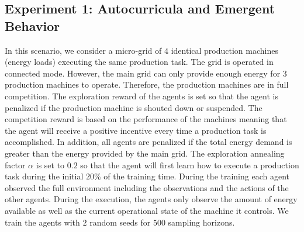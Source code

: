 \subsection{Experiment 1: Autocurricula and Emergent Behavior}
\label{subsec:51}
In this scenario, we consider a micro-grid of $4$ identical production machines (energy loads) executing the same production task. The grid is operated in connected mode. However, the main grid can only provide enough energy for $3$ production machines to operate. Therefore, the production machines are in full competition. The exploration reward of the agents is set so that the agent is penalized if the production machine is shouted down or suspended. The competition reward is based on the performance of the machines meaning that the agent will receive a positive incentive every time a production task is accomplished. In addition, all agents are penalized if the total energy demand is greater than the energy provided by the main grid. The exploration annealing factor $\alpha$ is set to $0.2$ so that the agent will first learn how to execute a production task during the initial $20\%$ of the training time. During the training each agent observed the full environment including the observations and the actions of the other agents. During the execution, the agents only observe the amount of energy available as well as the current operational state of the machine it controls. We train the agents with $2$ random seeds for $500$ sampling horizons.

